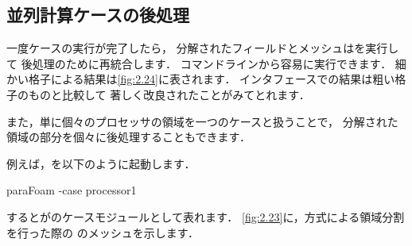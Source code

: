 \subsection{並列計算ケースの後処理}
\label{sssec:2.3.11}
一度ケースの実行が完了したら，
分解されたフィールドとメッシュはを実行して
後処理のために再統合します．
コマンドラインから容易に実行できます．
細かい格子による結果は\autoref{fig:2.24}に表されます．
インタフェースでの結果は粗い格子のものと比較して
著しく改良されたことがみてとれます．

また，単に個々のプロセッサの領域を一つのケースと扱うことで，
分解された領域の部分を個々に後処理することもできます．

例えば，を以下のように起動します．
\begin{OFverbatim}[terminal]
paraFoam -case processor1
\end{OFverbatim}
するとがのケースモジュールとして表れます．
\autoref{fig:2.23}に，方式による領域分割を行った際の
のメッシュを示します．
